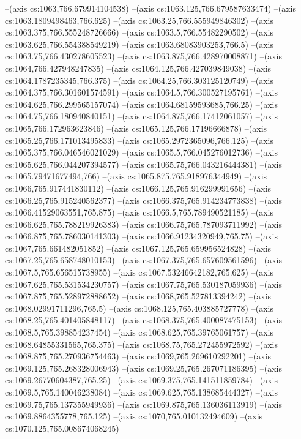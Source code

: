 --(axis cs:1063,766.679914104538)
--(axis cs:1063.125,766.679587633474)
--(axis cs:1063.1809498463,766.625)
--(axis cs:1063.25,766.555949846302)
--(axis cs:1063.375,766.555248726666)
--(axis cs:1063.5,766.55482290502)
--(axis cs:1063.625,766.554388549219)
--(axis cs:1063.68083903253,766.5)
--(axis cs:1063.75,766.430278605523)
--(axis cs:1063.875,766.428970008871)
--(axis cs:1064,766.427948247835)
--(axis cs:1064.125,766.427039849038)
--(axis cs:1064.1787235345,766.375)
--(axis cs:1064.25,766.303125120749)
--(axis cs:1064.375,766.301601574591)
--(axis cs:1064.5,766.300527195761)
--(axis cs:1064.625,766.299565157074)
--(axis cs:1064.68159593685,766.25)
--(axis cs:1064.75,766.180940840151)
--(axis cs:1064.875,766.17412061057)
--(axis cs:1065,766.172963623846)
--(axis cs:1065.125,766.17196666878)
--(axis cs:1065.25,766.171013495833)
--(axis cs:1065.2972365096,766.125)
--(axis cs:1065.375,766.046546021029)
--(axis cs:1065.5,766.045276012736)
--(axis cs:1065.625,766.044207394577)
--(axis cs:1065.75,766.043216444381)
--(axis cs:1065.79471677494,766)
--(axis cs:1065.875,765.918976344949)
--(axis cs:1066,765.917441830112)
--(axis cs:1066.125,765.916299991656)
--(axis cs:1066.25,765.915240562377)
--(axis cs:1066.375,765.914234773838)
--(axis cs:1066.41529063551,765.875)
--(axis cs:1066.5,765.789490521185)
--(axis cs:1066.625,765.788219926383)
--(axis cs:1066.75,765.787093711992)
--(axis cs:1066.875,765.786030141303)
--(axis cs:1066.91234320949,765.75)
--(axis cs:1067,765.661482051852)
--(axis cs:1067.125,765.659956524828)
--(axis cs:1067.25,765.658748010153)
--(axis cs:1067.375,765.657609561596)
--(axis cs:1067.5,765.656515738955)
--(axis cs:1067.53246642182,765.625)
--(axis cs:1067.625,765.531534230757)
--(axis cs:1067.75,765.530187059936)
--(axis cs:1067.875,765.528972888652)
--(axis cs:1068,765.527813394242)
--(axis cs:1068.02991711296,765.5)
--(axis cs:1068.125,765.403885727778)
--(axis cs:1068.25,765.401405848117)
--(axis cs:1068.375,765.400087475153)
--(axis cs:1068.5,765.398854237454)
--(axis cs:1068.625,765.39765061757)
--(axis cs:1068.64855331565,765.375)
--(axis cs:1068.75,765.272455972592)
--(axis cs:1068.875,765.270936754463)
--(axis cs:1069,765.269610292201)
--(axis cs:1069.125,765.268328006943)
--(axis cs:1069.25,765.267071186395)
--(axis cs:1069.26770604387,765.25)
--(axis cs:1069.375,765.141511859784)
--(axis cs:1069.5,765.140046238084)
--(axis cs:1069.625,765.138685444327)
--(axis cs:1069.75,765.137355949936)
--(axis cs:1069.875,765.136036113919)
--(axis cs:1069.8864355778,765.125)
--(axis cs:1070,765.010132494609)
--(axis cs:1070.125,765.008674068245)
